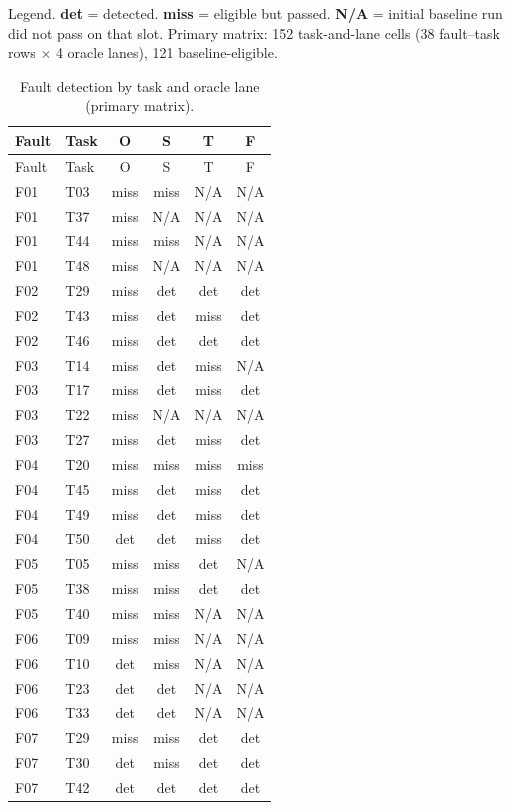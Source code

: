 Legend. \textbf{det} = detected. \textbf{miss} = eligible but passed. \textbf{N/A} = initial baseline run did not pass on that slot. Primary matrix: 152 task-and-lane cells (38 fault--task rows $\times$ 4 oracle lanes), 121 baseline-eligible.

\small
\begin{longtable}{@{}llcccc@{}}
\caption{Fault detection by task and oracle lane (primary matrix).} \\
\toprule
Fault & Task & O & S & T & F \\
\midrule
\endfirsthead
\toprule
Fault & Task & O & S & T & F \\
\midrule
\endhead
F01 & T03 & miss & miss & N/A & N/A \\
F01 & T37 & miss & N/A & N/A & N/A \\
F01 & T44 & miss & miss & N/A & N/A \\
F01 & T48 & miss & N/A & N/A & N/A \\
F02 & T29 & miss & det & det & det \\
F02 & T43 & miss & det & miss & det \\
F02 & T46 & miss & det & det & det \\
F03 & T14 & miss & det & miss & N/A \\
F03 & T17 & miss & det & miss & det \\
F03 & T22 & miss & N/A & N/A & N/A \\
F03 & T27 & miss & det & miss & det \\
F04 & T20 & miss & miss & miss & miss \\
F04 & T45 & miss & det & miss & det \\
F04 & T49 & miss & det & miss & det \\
F04 & T50 & det & det & miss & det \\
F05 & T05 & miss & miss & det & N/A \\
F05 & T38 & miss & miss & det & det \\
F05 & T40 & miss & miss & N/A & N/A \\
F06 & T09 & miss & miss & N/A & N/A \\
F06 & T10 & det & miss & N/A & N/A \\
F06 & T23 & det & det & N/A & N/A \\
F06 & T33 & det & det & N/A & N/A \\
F07 & T29 & miss & miss & det & det \\
F07 & T30 & det & miss & det & det \\
F07 & T42 & det & det & det & det \\

\end{longtable}
